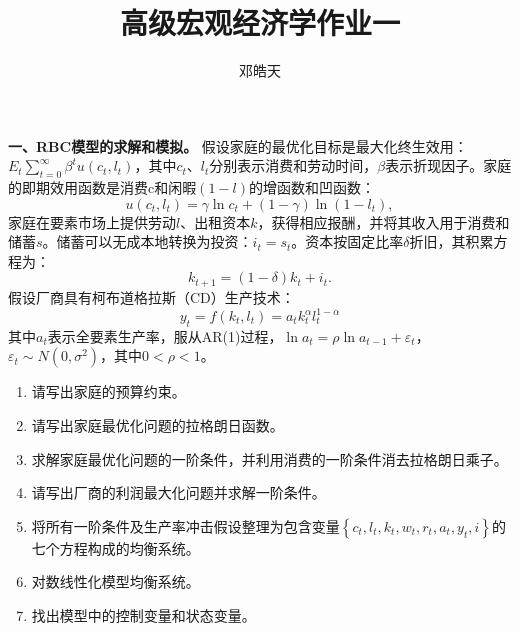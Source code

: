 \documentclass[12pt, a4paper, oneside]{article}
\title{\vspace{-3.3cm}\textbf{高级宏观经济学作业一}}
\author{邓皓天\quad 2023310114}
\date{}
\newcounter{problemname}
\newenvironment{problem}{\stepcounter{problemname}\par\noindent\textbf{}}{\par}
\begin{document}
\begin{CJK*}{UTF8}{gbsn}
\maketitle

\begin{problem}
	\textbf{一、RBC模型的求解和模拟。}
	假设家庭的最优化目标是最大化终生效用：$E_{t}\sum_{t=0}^{\infty}\beta^{t}u\left(c_{t},l_{t}\right)$，其中$c_{t}$、$l_{t}$分别表示消费和劳动时间，$\beta$表示折现因子。家庭的即期效用函数是消费c和闲暇$\left(1-l\right)$的增函数和凹函数：
	\[
	u\left(c_{t},l_{t}\right)=\gamma\ln c_{t}+\left(1-\gamma\right)\ln\left(1-l_{t}\right),
	\]
	家庭在要素市场上提供劳动$l$、出租资本$k$，获得相应报酬，并将其收入用于消费和储蓄$s$。储蓄可以无成本地转换为投资：$i_{t}=s_{t}$。资本按固定比率$\delta$折旧，其积累方程为：
	\[
	k_{t+1}=\left(1-\delta\right)k_{t}+i_{t}.
	\]
	假设厂商具有柯布道格拉斯（CD）生产技术：
	\[
	y_{t}=f\left(k_{t},l_{t}\right)=a_{t}k_{t}^{\alpha}l_{t}^{1-\alpha}
	\]
	其中$a_{t}$表示全要素生产率，服从AR(1)过程，$\ln a_{t}=\rho\ln a_{t-1}+\varepsilon_{t}$，$\varepsilon_{t}\sim N\left(0,\sigma^{2}\right)$，其中$0<\rho<1$。
	
	\begin{enumerate}
\item 请写出家庭的预算约束。
\item 请写出家庭最优化问题的拉格朗日函数。
\item 求解家庭最优化问题的一阶条件，并利用消费的一阶条件消去拉格朗日乘子。
\item 请写出厂商的利润最大化问题并求解一阶条件。
\item 将所有一阶条件及生产率冲击假设整理为包含变量$\left\{ c_{t},l_{t},k_{t},w_{t},r_{t},a_{t},y_{t},i\right\} $的七个方程构成的均衡系统。
\item 对数线性化模型均衡系统。
\item 找出模型中的控制变量和状态变量。


\end{enumerate}
\end{problem}
\end{CJK*}
\end{document}
